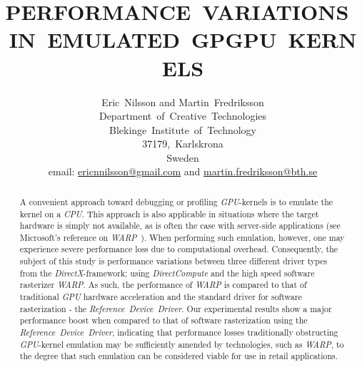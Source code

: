 \documentclass[a4paper,twocolumn,10pt]{article}
\begin{document}
\title{PERFORMANCE~VARIATIONS~IN~EMULATED~GPGPU~KERNELS}
\author{Eric~Nilsson and Martin~Fredriksson\\
Department~of~Creative~Technologies\\
Blekinge~Institute~of~Technology\\
37179,~Karlskrona\\
Sweden\\
email: \href{mailto:EricNNilsson@gmail.com}{ericnnilsson@gmail.com} and \href{mailto:martin.fredriksson@bth.se}{martin.fredriksson@bth.se}}
\date{}

\maketitle

\thispagestyle{empty}


\begin{abstract}
A convenient approach toward debugging or profiling \textit{GPU}-kernels is to emulate the kernel on a \textit{CPU}. This approach is also applicable in situations where the target hardware is simply not available, as is often the case with server-side applications (see Microsoft's reference on \textit{WARP}~). When performing such emulation, however, one may experience severe performance loss due to computational overhead. Consequently, the subject of this study is performance variations between three different driver types from the \textit{DirectX}-framework; using \textit{DirectCompute} and the high speed software rasterizer \textit{WARP}. As such, the performance of \textit{WARP} is compared to that of traditional \textit{GPU} hardware acceleration and the standard driver for software rasterization - the \textit{Reference~Device~Driver}. Our experimental results show a major performance boost when compared to that of software rasterization using the \textit{Reference~Device~Driver}, indicating that performance losses traditionally obstructing \textit{GPU}-kernel emulation may be sufficiently amended by technologies, such as \textit{WARP}, to the degree that such emulation can be considered viable for use in retail applications.
\end{abstract}

\end{document}

